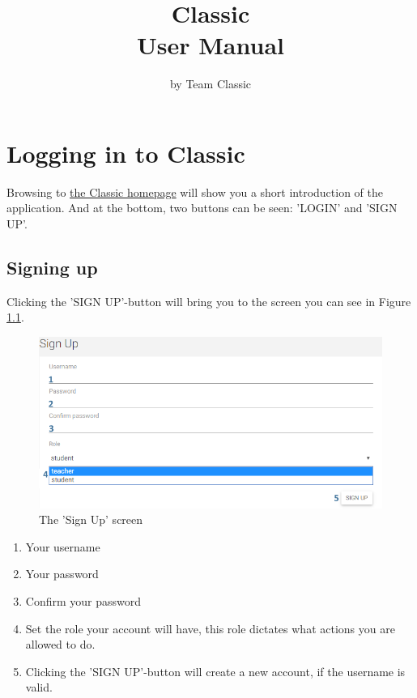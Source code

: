 \documentclass[a4paper,11pt]{report}
\begin{document}
\title{Classic\\User Manual}
\author{by Team Classic}
\date{}
\maketitle

\tableofcontents

\pagebreak
\begingroup
\renewcommand{\clearpage}{}

\chapter{Logging in to Classic}
Browsing to \href{http://student-dp8.intec.ugent.be/}{the Classic homepage} will show you a short introduction of the application. And at the bottom, two buttons can be seen: 'LOGIN' and 'SIGN UP'.

\section{Signing up}
Clicking the 'SIGN UP'-button will bring you to the screen you can see in Figure \ref{fig:sign_up}.

\begin{figure}[H]
\centering
\includegraphics[scale=0.55]{imgs/sign_up.png}
\caption{The 'Sign Up' screen}
\label{fig:sign_up}
\end{figure}
\begin{enumerate}
\item Your username
\item Your password
\item Confirm your password
\item Set the role your account will have, this role dictates what actions you are allowed to do.
\item Clicking the 'SIGN UP'-button will create a new account, if the username is valid.
\end{enumerate}
\end{document}

